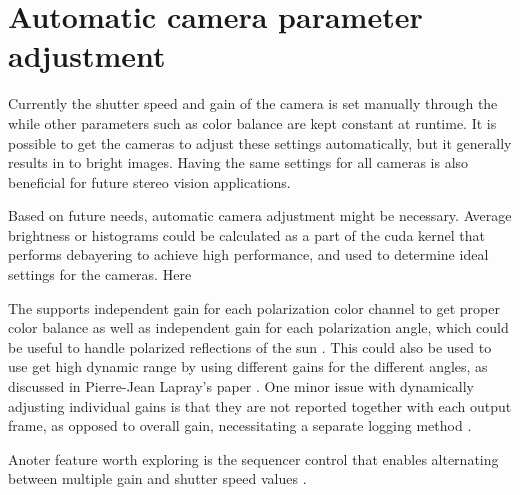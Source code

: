 \section{Automatic camera parameter adjustment}
Currently the shutter speed and gain of the camera is set manually through the \srgui while other parameters such as color balance are kept constant at runtime.
It is possible to get the cameras to adjust these settings automatically, but it generally results in to bright images.
Having the same settings for all cameras is also beneficial for future stereo vision applications.

Based on future needs, automatic camera adjustment might be necessary.
Average brightness or histograms could be calculated as a part of the \gls{cuda} kernel that performs debayering to achieve high performance, and used to determine ideal settings for the cameras.
Here

The \cams supports independent gain for each polarization color channel to get proper color balance as well as independent gain for each polarization angle, which could be useful to handle polarized reflections of the sun \cite{lucidvisionlabsTritonMPPolarized2020}.
This could also be used to use get high dynamic range by using different gains for the different angles, as discussed in Pierre-Jean Lapray's paper \cite{laprayExploitingRedundancyColorpolarization2020}.
One minor issue with dynamically adjusting individual gains is that they are not reported together with each output frame, as opposed to overall gain, necessitating a separate logging method \cite{lucidvisionlabsTritonMPPolarized2020}.

Anoter feature worth exploring is the sequencer control that enables alternating between multiple gain and shutter speed values \cite{lucidvisionlabsTritonMPPolarized2020}.